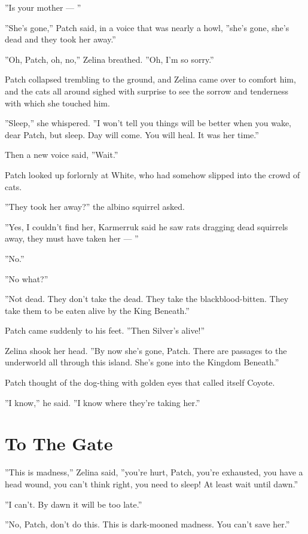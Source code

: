 \documentclass[12pt]{book}
\begin{document}
''Is your mother ---
''

''She's gone,'' Patch said, in a voice that was nearly a howl, ''she's gone, she's dead and they took her away.''

''Oh, Patch, oh, no,'' Zelina breathed. ''Oh, I'm so sorry.''

Patch collapsed trembling to the ground, and Zelina came over to comfort him, and the cats all around sighed with surprise to see the sorrow and tenderness with which she touched him.

''Sleep,'' she whispered. ''I won't tell you things will be better when you wake, dear Patch, but sleep. Day will come. You will heal. It was her time.''

Then a new voice said, ''Wait.''

Patch looked up forlornly at White, who had somehow slipped into the crowd of cats. 

''They took her away?'' the albino squirrel asked.

''Yes, I couldn't find her, Karmerruk said he saw rats dragging dead squirrels away, they must have taken her ---
''

''No.''

''No what?''

''Not dead. They don't take the dead. They take the blackblood-bitten. They take them to be eaten alive by the King Beneath.''

Patch came suddenly to his feet. ''Then Silver's alive!''

Zelina shook her head. ''By now she's gone, Patch. There are passages to the underworld all through this island. She's gone into the Kingdom Beneath.''

Patch thought of the dog-thing with golden eyes that called itself Coyote.

''I know,'' he said. ''I know where they're taking her.''


\section{To The Gate}

''This is madness,'' Zelina said, ''you're hurt, Patch, you're exhausted, you have a head wound, you can't think right, you need to sleep! At least wait until dawn.''

''I can't. By dawn it will be too late.''

''No, Patch, don't do this. This is dark-mooned madness. You can't save her.''
\end{document}
